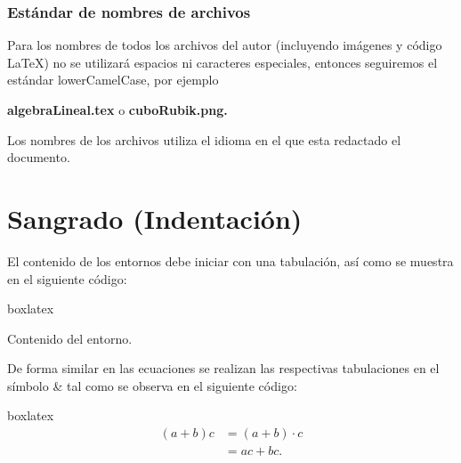 \subsubsection{Estándar de nombres de archivos}
Para los nombres de todos los archivos del autor (incluyendo imágenes y código \LaTeX) no se utilizará espacios ni caracteres especiales, entonces seguiremos el estándar lowerCamelCase, por ejemplo 
\begin{center}
	\textbf{algebraLineal.tex} o \textbf{cuboRubik.png.}
\end{center}
\begin{freebox}[Nota]
	Los nombres de los archivos utiliza el idioma en el que esta redactado el documento.
\end{freebox}
\newpage
\section{Sangrado (Indentación)}
El contenido de los entornos debe iniciar con una tabulación, así como se muestra en el siguiente código:
\begin{tcblisting}{boxlatex}
	\begin{<entorno>}
		Contenido del entorno.
	\end{<entorno>}
\end{tcblisting}
De forma similar en las ecuaciones se realizan las respectivas tabulaciones en el símbolo \& tal como se observa en el siguiente código: 
\begin{tcblisting}{boxlatex}	
	\begin{align*}
		(a+b)c&=(a+b)\cdot c\\
			    &=ac+bc.
	\end{align*}
\end{tcblisting}